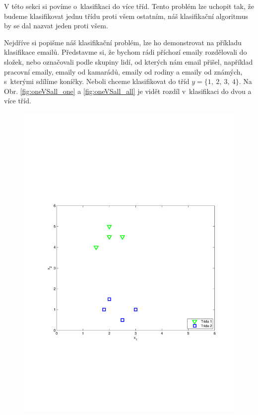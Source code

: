 \par{V této sekci si povíme o~klasifikaci do více tříd. Tento problém lze uchopit tak, že budeme klasifikovat jednu třídu proti všem ostatním, náš klasifikační algoritmus by se dal nazvat jeden proti všem.}

\par{Nejdříve si popišme náš klasifikační problém, lze ho demonstrovat na příkladu klasifikace emailů. Představme si, že bychom rádi příchozí emaily rozdělovali do složek, nebo označovali podle skupiny lidí, od kterých nám email přišel, například pracovní emaily, emaily od kamarádů, emaily od rodiny a emaily od známých, s~kterými sdílíme koníčky. Neboli chceme klasifikovat do tříd $y = \{ 1,~ 2,~ 3,~ 4 \}$. Na Obr. \ref{fig:oneVSall_one} a \ref{fig:oneVSall_all} je vidět rozdíl v~klasifikaci do dvou a více tříd.
\begin{figure}[!ht]
	\centering
	\begin{minipage}[b]{0.48\textwidth}
		\includegraphics[width = \textwidth, trim = 2.5cm 7cm 2cm 9cm]{./Img/BinarniRegrese/oneVSallClassification/oneVSall_one.pdf}

\end{minipage}
\end{figure}}
